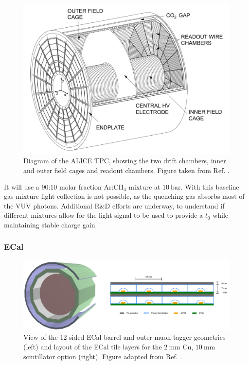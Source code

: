 \begin{figure}[t]
	\centering
	\includegraphics[width=0.7\linewidth]{Images/ND-GAr/alice_tpc}
	\caption[Diagram of the ALICE TPC, showing the two drift chambers, inner and outer field cages and readout chambers.]{Diagram of the ALICE TPC, showing the two drift chambers, inner and outer field cages and readout chambers. Figure taken from Ref. \cite{DUNE2021NDCDR}.}
	\label{fig:alice_tpc}
\end{figure}

It will use a 90:10 molar fraction $\mathrm{Ar}$:$\mathrm{CH}_{4}$ mixture at $10~\mathrm{bar}$. With this baseline gas mixture light collection is not possible, as the quenching gas absorbs most of the VUV photons. Additional R\&D efforts are underway, to understand if different mixtures allow for the light signal to be used to provide a $t_{0}$ while maintaining stable charge gain.

\subsubsection{ECal}

\begin{figure}[t]
	\centering
	\includegraphics[width=0.99\linewidth]{Images/ND-GAr/ndgar_ecal}
	\caption[View of the 12-sided ECal barrel and outer muon tagger geometries of ND-GAr.]{View of the 12-sided ECal barrel and outer muon tagger geometries (left) and layout of the ECal tile layers for the $2~\mathrm{mm}$ Cu, $10~\mathrm{mm}$ scintillator option (right). Figure adapted from Ref. \cite{DUNE2021NDCDR}.}
	\label{fig:ndgar_ecal}
\end{figure}

